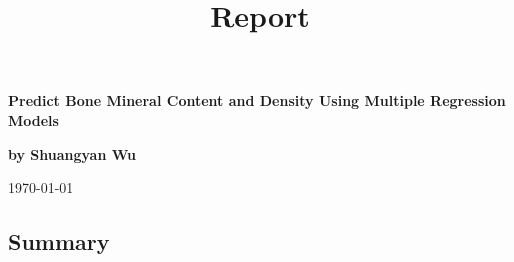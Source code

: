 \documentclass[11pt]{article}
\title{ Report}
\begin{document}
\begin{titlepage}
\begin{center}
\vspace*{6cm}

\textbf{Predict Bone Mineral Content and Density Using Multiple Regression Models}
\vspace{0.5cm} 
     
\textbf{by Shuangyan Wu}\\
    
\vfill
    
\vspace{0.8cm}
\today
         
\end{center}
\end{titlepage}
\tableofcontents
\listoffigures
\listoftables

\newpage
\begin{center}
\section*{Summary} 
\end{center}
\end{document}
